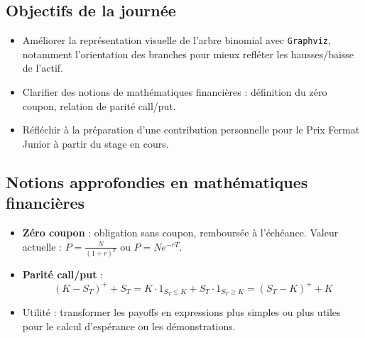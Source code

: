 \documentclass[a4paper,11pt]{article}
\begin{document}
\subsection{Objectifs de la journée}
\begin{itemize}
    \item Améliorer la représentation visuelle de l’arbre binomial avec \texttt{Graphviz}, notamment l'orientation des branches pour mieux refléter les hausses/baisse de l'actif.
    \item Clarifier des notions de mathématiques financières : définition du zéro coupon, relation de parité call/put.
    \item Réfléchir à la préparation d’une contribution personnelle pour le Prix Fermat Junior à partir du stage en cours.
\end{itemize}

\subsection{Notions approfondies en mathématiques financières}
\begin{itemize}
    \item \textbf{Zéro coupon} : obligation sans coupon, remboursée à l’échéance. Valeur actuelle : \( P = \frac{N}{(1 + r)^T} \) ou \( P = N e^{-rT} \).
    \item \textbf{Parité call/put} :
    \begin{equation*}
        (K - S_T)^+ + S_T = K \cdot 1_{S_T \leq K} + S_T \cdot 1_{S_T \geq K} = (S_T - K)^+ + K
    \end{equation*}
    \item Utilité : transformer les payoffs en expressions plus simples ou plus utiles pour le calcul d’espérance ou les démonstrations.
\end{itemize}
\end{document}
